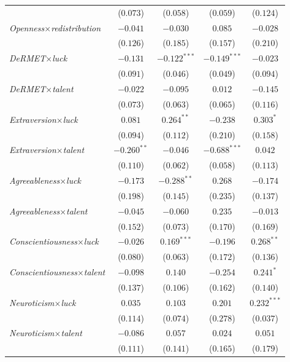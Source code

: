 \begin{footnotesize}
\begin{longtable}{l cc cc}
    & ($0.073$) & ($0.058$) & ($0.059$) & ($0.124$) \\
\textit{Openness}$\times$\textit{redistribution} & $-0.041$ & $-0.030$ & $0.085$ & $-0.028$ \\
    & ($0.126$) & ($0.185$) & ($0.157$) & ($0.210$) \\
\textit{DeRMET}$\times$\textit{luck} & $-0.131$ & $-0.122^{***}$ & $-0.149^{***}$ & $-0.023$ \\
    & ($0.091$) & ($0.046$) & ($0.049$) & ($0.094$) \\
\textit{DeRMET}$\times$\textit{talent} & $-0.022$ & $-0.095$ & $0.012$ & $-0.145$ \\
    & ($0.073$) & ($0.063$) & ($0.065$) & ($0.116$) \\
\textit{Extraversion}$\times$\textit{luck} & $0.081$ & $0.264^{**}$ & $-0.238$ & $0.303^{*}$ \\
    & ($0.094$) & ($0.112$) & ($0.210$) & ($0.158$) \\
\textit{Extraversion}$\times$\textit{talent} & $-0.260^{**}$ & $-0.046$ & $-0.688^{***}$ & $0.042$ \\
    & ($0.110$) & ($0.062$) & ($0.058$) & ($0.113$) \\
\textit{Agreeableness}$\times$\textit{luck} & $-0.173$ & $-0.288^{**}$ & $0.268$ & $-0.174$ \\
    & ($0.198$) & ($0.145$) & ($0.235$) & ($0.137$) \\
\textit{Agreeableness}$\times$\textit{talent} & $-0.045$ & $-0.060$ & $0.235$ & $-0.013$ \\
    & ($0.152$) & ($0.073$) & ($0.170$) & ($0.169$) \\
\textit{Conscientiousness}$\times$\textit{luck} & $-0.026$ & $0.169^{***}$ & $-0.196$ & $0.268^{**}$ \\
    & ($0.080$) & ($0.063$) & ($0.172$) & ($0.136$) \\
\textit{Conscientiousness}$\times$\textit{talent} & $-0.098$ & $0.140$ & $-0.254$ & $0.241^{*}$ \\
    & ($0.137$) & ($0.106$) & ($0.162$) & ($0.140$) \\
\textit{Neuroticism}$\times$\textit{luck} & $0.035$ & $0.103$ & $0.201$ & $0.232^{***}$ \\
    & ($0.114$) & ($0.074$) & ($0.278$) & ($0.037$) \\
\textit{Neuroticism}$\times$\textit{talent} & $-0.086$ & $0.057$ & $0.024$ & $0.051$ \\
    & ($0.111$) & ($0.141$) & ($0.165$) & ($0.179$) \\

\end{longtable}
\end{footnotesize}
